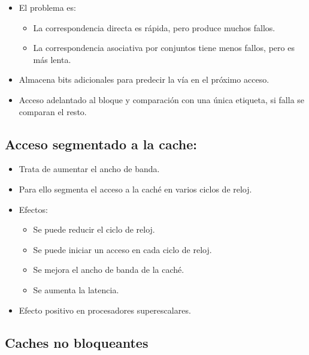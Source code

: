 \documentclass[12pt, twoside, openright]{report} %
\begin{document}
\begin{itemize}

	\item El problema es:

	      \begin{itemize}

		      \item La correspondencia directa es rápida, pero produce muchos
		            fallos.
		      \item La correspondencia asociativa por conjuntos tiene menos fallos,
		            pero es más lenta.
	      \end{itemize}
	\item Almacena bits adicionales para predecir la vía en el próximo
	      acceso.
	\item Acceso adelantado al bloque y comparación con una única etiqueta,
	      si falla se comparan el resto.
\end{itemize}
\subsection{Acceso segmentado a la cache:}

\begin{itemize}

	\item Trata de aumentar el ancho de banda.
	\item Para ello segmenta el acceso a la caché en varios ciclos de reloj.
	\item Efectos:

	      \begin{itemize}

		      \item Se puede reducir el ciclo de reloj.
		      \item Se puede iniciar un acceso en cada ciclo de reloj.
		      \item Se mejora el ancho de banda de la caché.
		      \item Se aumenta la latencia.
	      \end{itemize}
	\item Efecto positivo en procesadores superescalares.
\end{itemize}
\subsection{Caches no bloqueantes}
\end{document}

